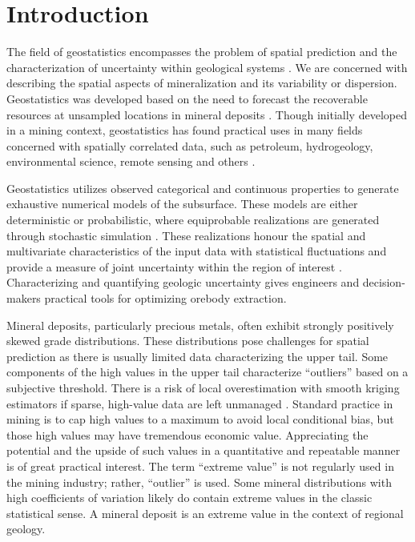 
\chapter{Introduction}
\label{ch:01intro}

The field of geostatistics encompasses the problem of spatial prediction and the characterization of uncertainty within geological systems \citep{deutsch1992geostatistical}. We are concerned with describing the spatial aspects of mineralization and its variability or dispersion. Geostatistics was developed based on the need to forecast the recoverable resources at unsampled locations in mineral deposits \citep{matheron1963principles}. Though initially developed in a mining context, geostatistics has found practical uses in many fields concerned with spatially correlated data, such as petroleum, hydrogeology, environmental science, remote sensing and others \citep{goovaerts1997geostatistics}.

Geostatistics utilizes observed categorical and continuous properties to generate exhaustive numerical models of the subsurface. These models are either deterministic or probabilistic, where equiprobable realizations are generated through stochastic simulation \citep{chiles2012geostatistics}. These realizations honour the spatial and multivariate characteristics of the input data with statistical fluctuations and provide a measure of joint uncertainty within the region of interest \citep{rossi2013mineral}. Characterizing and quantifying geologic uncertainty gives engineers and decision-makers practical tools for optimizing orebody extraction.

Mineral deposits, particularly precious metals, often exhibit strongly positively skewed grade distributions. These distributions pose challenges for spatial prediction as there is usually limited data characterizing the upper tail. Some components of the high values in the upper tail characterize ``outliers'' based on a subjective threshold. There is a risk of local overestimation with smooth kriging estimators if sparse, high-value data are left unmanaged \citep{leuangthong2015dealing}. Standard practice in mining is to cap high values to a maximum to avoid local conditional bias, but those high values may have tremendous economic value. Appreciating the potential and the upside of such values in a quantitative and repeatable manner is of great practical interest. The term ``extreme value'' is not regularly used in the mining industry; rather, ``outlier'' is used. Some mineral distributions with high coefficients of variation likely do contain extreme values in the classic statistical sense. A mineral deposit is an extreme value in the context of regional geology.


